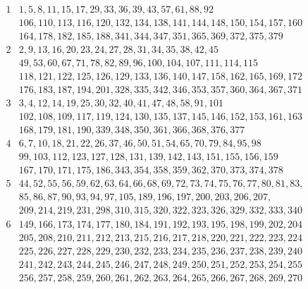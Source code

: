 \documentclass[final,onefignum,onetabnum]{siamart190516}
\begin{document}
\begin{table}[H]
\renewcommand{\arraystretch}{1.1}
\begin{small}
\[
\begin{array}{|*{2}{c|}}
	\hline
	1 & 1, 5, 8, 11, 15, 17, 29, 33, 36, 39, 43, 57, 61, 88, 92 \\
	& 106, 110, 113, 116, 120, 132, 134, 138, 141, 144, 148, 150, 154, 157, 160 \\
	& 164, 178, 182, 185, 188, 341, 344, 347, 351, 365, 369, 372, 375, 379\\
	\hline
	2 & 2, 9, 13, 16, 20, 23, 24, 27, 28, 31, 34, 35, 38, 42, 45\\
	& 49, 53, 60, 67, 71, 78, 82, 89, 96, 100, 104, 107, 111, 114, 115\\
	& 118, 121, 122, 125, 126, 129, 133, 136, 140, 147, 158, 162, 165, 169, 172\\
	& 176, 183, 187, 194, 201, 328, 335, 342, 346, 353, 357, 360, 364, 367, 371\\
	\hline
	3 & 3, 4, 12, 14, 19, 25, 30, 32, 40, 41, 47, 48, 58, 91, 101\\
	& 102, 108, 109, 117, 119, 124, 130, 135, 137, 145, 146, 152, 153, 161, 163\\
	& 168, 179, 181, 190, 339, 348, 350, 361, 366, 368, 376, 377\\
	\hline
	4 & 6, 7, 10, 18, 21, 22, 26, 37, 46, 50, 51, 54, 65, 70, 79, 84, 95, 98\\
	& 99, 103, 112, 123, 127, 128, 131, 139, 142, 143, 151, 155, 156, 159\\
	& 167, 170, 171, 175, 186, 343, 354, 358, 359, 362, 370, 373, 374, 378\\
	\hline
	5 & 44, 52, 55, 56, 59, 62, 63, 64, 66, 68, 69, 72, 73, 74, 75, 76, 77, 80, 81, 83,\\
	&  85, 86, 87, 90, 93, 94, 97, 105, 189, 196, 197, 200, 203, 206, 207, \\
	& 209, 214, 219, 231, 298, 310, 315, 320, 322, 323,  326, 329, 332, 333, 340\\
	\hline
	6 & 149, 166, 173, 174, 177, 180, 184, 191, 192, 193, 195, 198, 199, 202, 204\\
	& 205, 208, 210, 211, 212, 213, 215, 216, 217, 218, 220, 221, 222, 223, 224\\
	& 225, 226, 227, 228, 229, 230, 232, 233, 234, 235, 236, 237, 238, 239, 240\\
	& 241, 242, 243, 244, 245, 246, 247, 248, 249, 250, 251, 252, 253, 254, 255\\
	& 256, 257, 258, 259, 260, 261, 262, 263, 264, 265, 266, 267, 268, 269, 270\\

\end{array}\]
\end{small}
\end{table}
\end{document}

